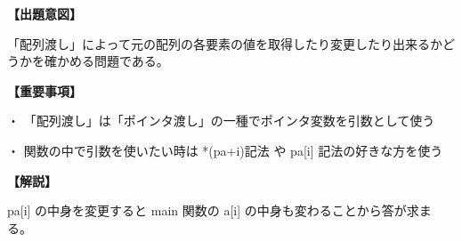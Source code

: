 \noindent \textbf{【出題意図】}

\noindent 「配列渡し」によって元の配列の各要素の値を取得したり変更したり出来るかどうかを確かめる問題である。

\vspace{1em}
\noindent \textbf{【重要事項】}

\medskip
\noindent ・ 「配列渡し」は「ポインタ渡し」の一種でポインタ変数を引数として使う

\medskip
\noindent ・ 関数の中で引数を使いたい時は *(pa+i)記法 や pa[i] 記法の好きな方を使う

\vspace{1em}
\noindent \textbf{【解説】}

\noindent pa[i] の中身を変更すると main 関数の a[i] の中身も変わることから答が求まる。
